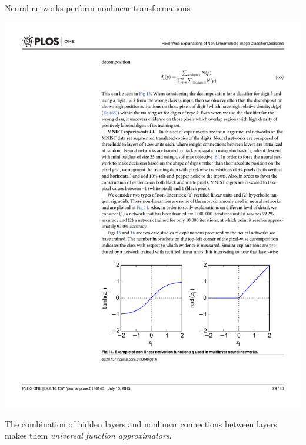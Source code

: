 \documentclass[xetex,compress]{beamer}
\begin{document}
\begin{frame}{Neural networks perform nonlinear transformations}
  \begin{center}
    \includegraphics[width=1.00\textwidth]{./figures/activations.pdf}
  \end{center}
  The combination of hidden layers and nonlinear connections between layers makes them \emph{universal function approximators}.
\end{frame}

\end{document}
